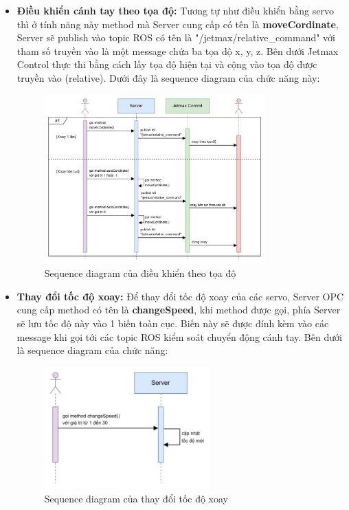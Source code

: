 \begin{itemize}
    \item \textbf{Điều khiển cánh tay theo tọa độ:} Tương tự như điều khiển bằng servo thì ở tính năng này method mà Server cung cấp có tên là \textbf{moveCordinate}, Server sẽ publish vào topic ROS có tên là "/jetmax/relative\_command" với tham số truyền vào là một message chứa ba tọa dộ x, y, z. Bên dưới Jetmax Control thực thi bằng cách lấy tọa độ hiện tại và cộng vào tọa độ được truyền vào (relative). Dưới đây là sequence diagram của chức năng này:
    \begin{figure}[!h]
        \centering
        \includegraphics[width=0.8\textwidth]{Images/Implementation/Control/dieukhientheo_toado.jpg}
        \caption{Sequence diagram của điều khiển theo tọa độ}
    \end{figure}

    \newpage
    
    \item \textbf{Thay đổi tốc độ xoay:} Để thay đổi tốc độ xoay của các servo, Server OPC cung cấp method có tên là \textbf{changeSpeed}, khi method được gọi, phía Server sẽ lưu tốc độ này vào 1 biến toàn cục. Biến này sẽ được đính kèm vào các message khi gọi tới các topic ROS kiểm soát chuyển động cánh tay. Bên dưới là sequence diagram của chức năng:
    \begin{figure}[!h]
        \centering
        \includegraphics[width=0.6\textwidth]{Images/Implementation/Control/changespeed.jpg}
        \caption{Sequence diagram của thay đổi tốc độ xoay}
    \end{figure}
    

\end{itemize}
